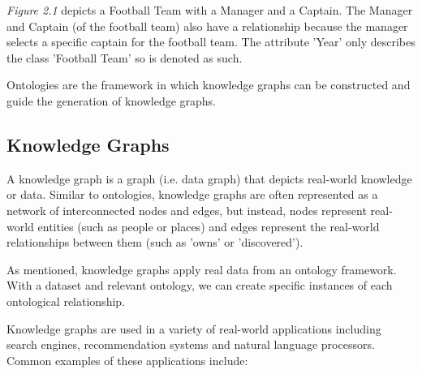 \textit{Figure 2.1} depicts a Football Team with a Manager and a Captain. The Manager and Captain (of the football team) also have a relationship because the manager selects a specific captain for the football team. The attribute 'Year' only describes the class 'Football Team' so is denoted as such.

Ontologies are the framework in which knowledge graphs can be constructed and guide the generation of knowledge graphs. 

\subsection{Knowledge Graphs}
\hspace{0.5cm} A knowledge graph is a graph (i.e. data graph) that depicts real-world knowledge or data. \cite{knowledgegraph} Similar to ontologies, knowledge graphs are often represented as a network of interconnected nodes and edges, but instead, nodes represent real-world entities (such as people or places) and edges represent the real-world relationships between them (such as 'owns' or 'discovered'). 

As mentioned, knowledge graphs apply real data from an ontology framework. With a dataset and relevant ontology, we can create specific instances of each ontological relationship. 

Knowledge graphs are used in a variety of real-world applications including search engines, recommendation systems and natural language processors. Common examples of these applications include:

